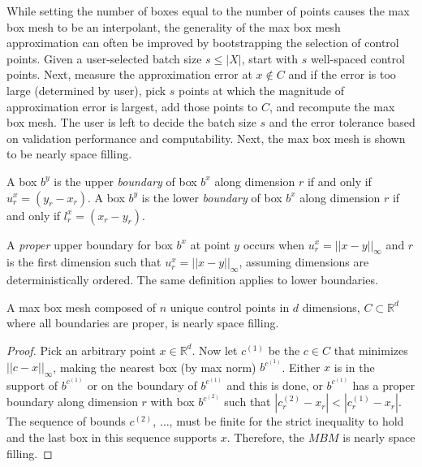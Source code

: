 While setting the number of boxes equal to the number of points causes the max box mesh to be an interpolant, the generality of the max box mesh approximation can often be improved by bootstrapping the selection of control points. Given a user-selected batch size $s \leq |X|$, start with $s$ well-spaced control points. Next, measure the approximation error at $x \notin C$ and if the error is too large (determined by user), pick $s$ points at which the magnitude of approximation error is largest, add those points to $C$, and recompute the max box mesh. The user is left to decide the batch size $s$ and the error tolerance based on validation performance and computability. Next, the max box mesh is shown to be nearly space filling.


\begin{definition}
A box $b^y$ is the upper \textit{boundary} of box $b^x$ along dimension $r$ if and only if $u^x_r = (y_r - x_r)$. A box $b^y$ is the lower \textit{boundary} of box $b^x$ along dimension $r$ if and only if $l^x_r = (x_r - y_r)$.
\end{definition}

\begin{definition}
A \textit{proper} upper boundary for box $b^x$ at point $y$ occurs when $u^x_r = ||x - y||_\infty$ and $r$ is the first dimension such that $u^x_r = ||x - y||_\infty$, assuming dimensions are deterministically ordered. The same definition applies to lower boundaries.
\end{definition}

\begin{theorem}
A max box mesh composed of $n$ unique control points in $d$ dimensions, $C \subset \mathbb{R}^d$ where all boundaries are proper, is nearly space filling.
\label{theorem_mutual_space_filling}
\end{theorem}
\begin{proof}
Pick an arbitrary point $x \in \mathbb{R}^d$. Now let $c^{(1)}$ be the $c \in C$ that minimizes $|| c - x ||_\infty$, making the nearest box (by max norm) $b^{c^{(1)}}$. Either $x$ is in the support of $b^{c^{(1)}}$ or on the boundary of $b^{c^{(1)}}$ and this is done, or $b^{c^{(1)}}$ has a proper boundary along dimension $r$ with box $b^{c^{(2)}}$ such that $|c^{(2)}_r - x_r| < |c^{(1)}_r - x_r|$. The sequence of bounds $c^{(2)}$, $\ldots$, must be finite for the strict inequality to hold and the last box in this sequence supports $x$. Therefore, the $MBM$ is nearly space filling.
\end{proof}

